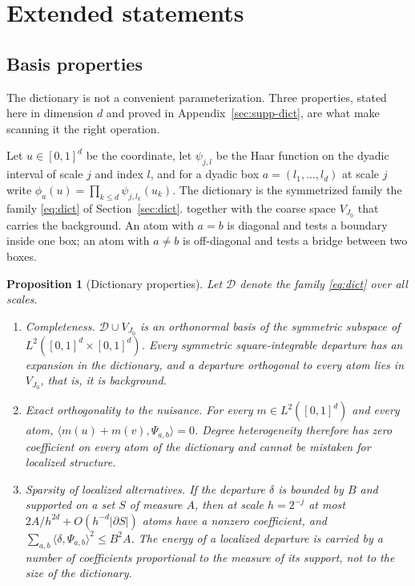 \documentclass[11pt]{article}
\newtheorem{proposition}[theorem]{Proposition}
\theoremstyle{definition}
\newcommand{\1}{\mathbf 1}\newcommand{\op}{\operatorname}
\begin{document}
\section{Extended statements}\label{sec:supp-extended}



\subsection{Basis properties}                             \label{app:sec-thy-basis}


The dictionary is not a convenient parameterization.  Three properties, stated
here in dimension $d$ and proved in Appendix~\ref{sec:supp-dict}, are what make
scanning it the right operation.

Let $u\in[0,1]^d$ be the coordinate, let $\psi_{j,l}$ be the Haar function on
the dyadic interval of scale $j$ and index $l$, and for a dyadic box
$a=(l_1,\dots,l_d)$ at scale $j$ write $\phi_a(u)=\prod_{k\le d}\psi_{j,l_k}(u_k)$.
The dictionary is the symmetrized family
the family \eqref{eq:dict} of Section~\ref{sec:dict}.
together with the coarse space $V_{J_0}$ that carries the background.  An atom
with $a=b$ is diagonal and tests a boundary inside one box; an atom with
$a\ne b$ is off-diagonal and tests a bridge between two boxes.

\begin{proposition}[Dictionary properties]                  \label{app:prop-dict}
Let $\mathcal D$ denote the family \eqref{eq:dict} over all scales.
\begin{enumerate}[label=\textup{(\roman*)},leftmargin=*]
\item \textup{Completeness.}  $\mathcal D\cup V_{J_0}$ is an orthonormal basis
of the symmetric subspace of $L^2([0,1]^d\times[0,1]^d)$.  Every symmetric
square-integrable departure has an expansion in the dictionary, and a departure
orthogonal to every atom lies in $V_{J_0}$, that is, it is background.
\item \textup{Exact orthogonality to the nuisance.}  For every
$m\in L^2([0,1]^d)$ and every atom, $\langle m(u)+m(v),\Psi_{a,b}\rangle=0$.
Degree heterogeneity therefore has zero coefficient on every atom of the
dictionary and cannot be mistaken for localized structure.
\item \textup{Sparsity of localized alternatives.}  If the departure $\delta$
is bounded by $B$ and supported on a set $S$ of measure $A$, then at scale
$h=2^{-j}$ at most $2A/h^{2d}+O(h^{-d}|\partial S|)$ atoms have a nonzero
coefficient, and $\sum_{a,b}\langle\delta,\Psi_{a,b}\rangle^2\le B^2A$.  The
energy of a localized departure is carried by a number of coefficients
proportional to the measure of its support, not to the size of the dictionary.
\end{enumerate}
\end{proposition}
\end{document}
